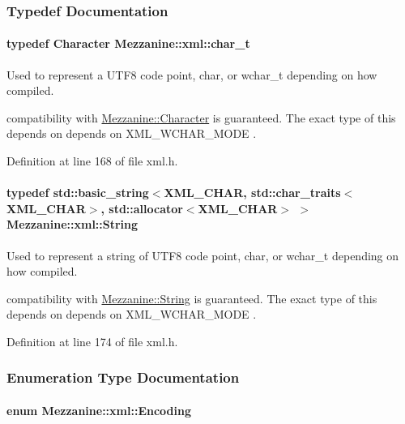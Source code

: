 \subsubsection{Typedef Documentation}
\hypertarget{namespaceMezzanine_1_1xml_a29b8a47c179e9895c4e9e66c45d1dbbc}{
\paragraph[{char\_\-t}]{\setlength{\rightskip}{0pt plus 5cm}typedef {\bf Character} {\bf Mezzanine::xml::char\_\-t}}\hfill}
\label{namespaceMezzanine_1_1xml_a29b8a47c179e9895c4e9e66c45d1dbbc}


Used to represent a UTF8 code point, char, or wchar\_\-t depending on how compiled. 

compatibility with \hyperlink{namespaceMezzanine_ad5147a419db7627ee552a2b582f1052d}{Mezzanine::Character} is guaranteed. The exact type of this depends on depends on XML\_\-WCHAR\_\-MODE . 

Definition at line 168 of file xml.h.

\hypertarget{namespaceMezzanine_1_1xml_a3ddf35656ecc38b6fa1d0364d9ad3b2c}{
\paragraph[{String}]{\setlength{\rightskip}{0pt plus 5cm}typedef std::basic\_\-string$<$XML\_\-CHAR, std::char\_\-traits$<$XML\_\-CHAR$>$, std::allocator$<$XML\_\-CHAR$>$ $>$ {\bf Mezzanine::xml::String}}\hfill}
\label{namespaceMezzanine_1_1xml_a3ddf35656ecc38b6fa1d0364d9ad3b2c}


Used to represent a string of UTF8 code point, char, or wchar\_\-t depending on how compiled. 

compatibility with \hyperlink{namespaceMezzanine_acf9fcc130e6ebf08e3d8491aebcf1c86}{Mezzanine::String} is guaranteed. The exact type of this depends on depends on XML\_\-WCHAR\_\-MODE . 

Definition at line 174 of file xml.h.



\subsubsection{Enumeration Type Documentation}
\hypertarget{namespaceMezzanine_1_1xml_ab1e7e96991b9c08ac13e797a15253804}{
\paragraph[{Encoding}]{\setlength{\rightskip}{0pt plus 5cm}enum {\bf Mezzanine::xml::Encoding}}\hfill}
\label{namespaceMezzanine_1_1xml_ab1e7e96991b9c08ac13e797a15253804}


